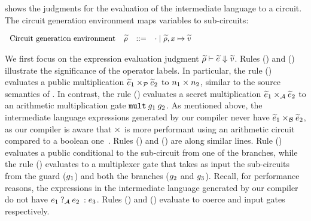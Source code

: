  shows the judgments for the evaluation of
the intermediate language to a circuit. The circuit generation environment maps
variables to sub-circuits:

\vspace{0.2cm}
$
\small
\begin{array}{rrcl}
    \ftext{Circuit generation environment} & \widetilde\rho &::=& \cdot \mid \widetilde\rho,x \mapsto \val\\
\end{array}
$
\vspace{0.2cm}

We first focus on the expression evaluation judgment
$\widetilde{\rho} \vdash \widetilde{e} \Downarrow\val$. 
%
Rules ({}) and ({}) illustrate
the significance of the operator labels. In particular, the rule
({}) evaluates a public multiplication $\widetilde{e}_{1}
\mulop_{\mathcal{P}} \widetilde{e}_{2}$ to $n_{1} \mulop n_{2}$, similar to the
source semantics of . In contrast, the rule
({}) evaluates a secret multiplication $\widetilde{e}_{1}
\mulop_{\mathcal{A}} \widetilde{e}_{2}$ to an arithmetic multiplication
gate $\kw{mult}\:\gate_{1}\:\gate_{2}$. As mentioned above, the intermediate language
expressions generated by our compiler never have $\widetilde{e}_{1}
\mulop_{\mathcal{B}} \widetilde{e}_{2}$, as our compiler is aware that $\mulop$
is more performant using an arithmetic circuit compared to a boolean
one~\cite{aby}. Rules ({}) and ({})
are along similar lines. Rule ({}) evaluates a public
conditional to the sub-circuit  from one of the branches, while the rule
({}) evaluates to a multiplexer  gate that takes as  input
the sub-circuits from the guard ($\gate_{1}$) and both the branches
($\gate_{2}$ and $\gate_{3}$). Recall, for performance reasons,
the  expressions in the intermediate language generated by our compiler do not have
$\lcond{\mathcal{A}}{e_{1}}{e_{2}}{e_{3}}$. Rules
({}) and ({}) evaluate to coerce and input
gates respectively.

